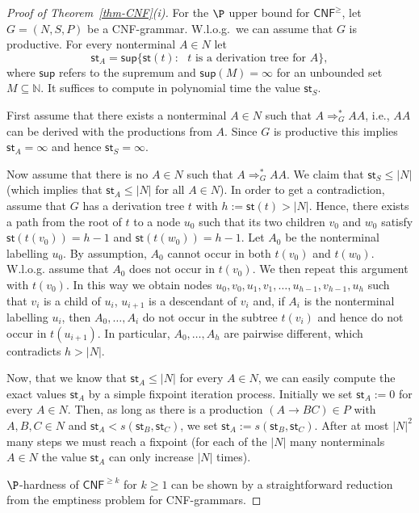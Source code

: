 \documentclass[a4paper,UKenglish,cleveref, autoref, thm-restate, numberwithinsect]{lipics-v2021}
\newcommand{\derive}{\Rightarrow}
\newcommand{\hs}{\mathsf{st}}
\newcommand{\CNF}{\mathsf{CNF}}
\begin{document}
\begin{proof}[Proof of Theorem~\ref{thm-CNF}(i)]
For the $\P$ upper bound for $\CNF^\ge$, let  $G = (N,S,P)$ be a CNF-grammar. W.l.o.g.~we can assume that $G$ is productive.
For every nonterminal $A \in N$ let
\[ \hs_A = \mathsf{sup} \{ \hs(t) : \text{ $t$ is a derivation tree for $A$}\},\] 
where $\mathsf{sup}$ refers to the supremum and $\mathsf{sup}(M) = \infty$ for an unbounded set $M \subseteq \mathbb{N}$.
It suffices to compute in polynomial time the value $\hs_S$.

First assume that there exists a nonterminal $A \in N$
such that $A \derive_G^* AA$, i.e., $AA$ can be derived with the productions from $A$.
Since $G$ is productive this implies $\hs_A = \infty$ and hence $\hs_S = \infty$.

Now assume that there is no $A \in N$
such that $A \derive_G^* AA$.
We claim that $\hs_S \leq |N|$ (which implies that $\hs_A \leq |N|$ for all $A \in N$).
In order to get a contradiction, assume that $G$ has a derivation tree $t$ with $h := \hs(t) > |N|$.
Hence, there exists a path from the root of $t$ to a node $u_0$ such that its two children $v_{0}$ and $w_{0}$ satisfy
$\hs(t(v_{0})) = h-1$ and $\hs(t(w_{0})) = h-1$. Let $A_0$ be the nonterminal labelling
$u_0$. By assumption, $A_0$ cannot
occur in both $t(v_{0})$ and $t(w_{0})$. W.l.o.g. assume that $A_0$ does not occur in $t(v_{0})$.
We then repeat this argument with $t(v_{0})$. In this way we obtain nodes $u_0, v_0, u_1, v_1, \ldots, u_{h-1}, v_{h-1},u_h$ such that
$v_i$ is a child of $u_i$, $u_{i+1}$ is a descendant of $v_i$ and, if $A_i$ is the nonterminal labelling $u_i$, then 
$A_0, \ldots, A_{i}$ do not occur in the subtree $t(v_i)$ and hence do not occur in $t(u_{i+1})$.  
In particular, $A_0, \ldots, A_{h}$ are pairwise different, which contradicts $h > |N|$.

Now, that we know that $\hs_A \leq |N|$ for every $A \in N$, we can easily compute the exact values $\hs_A$
 by a simple fixpoint iteration process.
Initially we set $\hs_A :=0$ for every $A \in N$. Then, as long as there is a production $(A \to BC) \in P$ with $A,B,C \in N$ and
$\hs_A < s(\hs_B, \hs_C)$, we set $\hs_A := s(\hs_B, \hs_C)$. After at most $|N|^2$ many steps we must reach a fixpoint
(for each of the $|N|$ many nonterminals $A \in N$ the value $\hs_A$ can only increase $|N|$ times).

$\P$-hardness of $\CNF^{\ge k}$ for $k \ge 1$ can be shown by a straightforward
reduction from the emptiness problem for CNF-grammars.
\end{proof}
\end{document}
